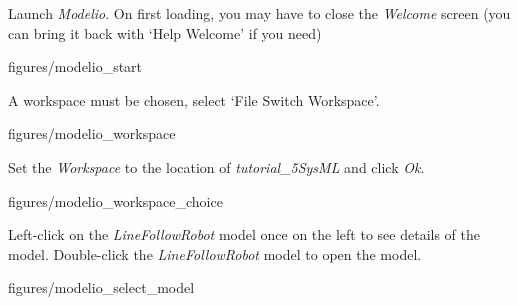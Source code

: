 \documentclass[11pt,a4paper]{../tutorial}
\begin{document}
\begin{instructions}

\item Launch \emph{Modelio}. On first loading, you may have to close the \emph{Welcome} screen (you can bring it back with `Help \menusep Welcome' if you need)

\begin{center}
\begin{annotation}[width=1\linewidth,trim=0 400 0 0,clip]{figures/modelio_start}
    \end{annotation}
\end{center}

\item A workspace must be chosen, select `File \menusep Switch Workspace’.

\begin{center}
\begin{annotation}[width=1\linewidth,trim=0 700 0 0,clip]{figures/modelio_workspace}
    \end{annotation}
\end{center}


\newpage

\item Set the \emph{Workspace} to the location of \emph{tutorial\_5\pathsep{}SysML} and click \emph{Ok}.

\begin{center}
\begin{annotation}[width=0.5\linewidth,trim=0 0 0 0,clip]{figures/modelio_workspace_choice}
    \end{annotation}
\end{center}


\item Left-click on the \emph{LineFollowRobot} model once on the left to see details of the model. Double-click the \emph{LineFollowRobot} model to open the model.

\begin{center}
\begin{annotation}[width=1\linewidth,trim=0 300 0 0,clip]{figures/modelio_select_model}
    \end{annotation}
\end{center}

\end{instructions}
\end{document}
